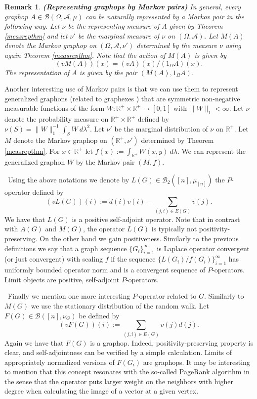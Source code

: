 \documentclass[a4wider]{amsart}
\newtheorem{remarka}[theorem]{Remark}
\theoremstyle{definitionbreak}\newtheorem{D}[theorem]{Definition}
\theoremstyle{definitionbreak}\newtheorem*{D*}{Definition}
\begin{document}
\begin{remarka} {\bf (Representing graphops by Markov pairs)} In general, every graphop $A\in\mathcal{B}(\Omega,\mathcal{A},\mu)$ can be naturally represented by a Markov pair in the following way. Let $\nu$ be the representing measure of $A$ given by Theorem \ref{measrepthm} and let $\nu'$ be the marginal measure of $\nu$ on $(\Omega,\mathcal{A})$. Let $M(A)$ denote the Markov graphop on $(\Omega,\mathcal{A},\nu')$ determined by the measure $\nu$ using again Theorem \ref{measrepthm}. Note that the action of $M(A)$ is given by $$(vM(A))(x)=(vA)(x)/(1_\Omega A)(x).$$ The representation of $A$ is given by the pair $(M(A),1_\Omega A)$.
\end{remarka}

Another interesting use of Markov pairs is that we can use them to represent generalized graphons (related to graphexes \cite{BCCH, janson}) that are symmetric non-negative measurable functions of the form $W:\mathbb{R}^+\times\mathbb{R}^+\to [0,1]$ with $\|W\|_1<\infty$. Let $\nu$ denote the probability measure on $\mathbb{R}^+\times\mathbb{R}^+$ defined by $\nu(S)=\|W\|_1^{-1}\int_S W~d\lambda^2$. Let $\nu'$ be the marginal distribution of $\nu$ on $\mathbb{R}^+$. Let $M$ denote the Markov graphop on $(\mathbb{R}^+,\nu')$ determined by Theorem \ref{measrepthm}. For $x\in\mathbb{R}^+$ let $f(x):=\int_{\mathbb{R}^+} W(x,y)~d\lambda$. We can represent the generalized graphon $W$ by the Markov pair $(M,f)$.



\medskip

~Using the above notations we denote by $L(G)\in\mathcal{B}_2([n],\mu_{[n]})$ the $P$-operator defined by 
$$(vL(G))(i):=d(i)v(i)-\sum_{(j,i)\in E(G)} v(j).$$
We have that $L(G)$ is a positive self-adjoint operator. Note that in contrast with $A(G)$ and $M(G)$, the operator $L(G)$ is typically not positivity-preserving. On the other hand we gain positiveness. Similarly to the previous definitions we say that a graph sequence $\{G_i\}_{i=1}^\infty$ is Laplace operator convergent (or just convergent) with scaling $f$ if the sequence $\{L(G_i)/f(G_i)\}_{i=1}^\infty$ has uniformly bounded operator norm and is a convergent sequence of $P$-operators. Limit objects are positive, self-adjoint $P$-operators. 

\medskip

~Finally we mention one more interesting $P$-operator related to $G$. Similarly to $M(G)$ we use the stationary distribution of the random walk. Let $F(G)\in\mathcal{B}([n],\nu_G)$ be defined by $$(vF(G))(i):=\sum_{(j,i)\in E(G)} v(j)d(j).$$ Again we have that $F(G)$ is a graphop. Indeed, positivity-preserving property is clear, and self-adjointness can be verified by a simple calculation. Limits of appropriately normalized versions of $F(G_i)$ are graphops. It may be interesting to mention that this concept resonates with the so-called PageRank algorithm \cite{pagerank} in the sense that the operator puts larger weight on the neighbors with higher degree when calculating the image of a vector at a given vertex. 
\end{document}
